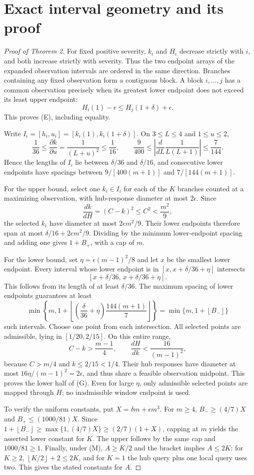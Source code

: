 \documentclass[11pt,letterpaper]{article}
\newcommand{\floor}[1]{\left\lfloor #1\right\rfloor}
\begin{document}
\section{Exact interval geometry and its proof}
\begin{proof}[Proof of Theorem 2]
For fixed positive severity, $k_i$ and $H_i$ decrease strictly with $i$, and both increase strictly with severity. Thus the two endpoint arrays of the expanded observation intervals are ordered in the same direction. Branches containing any fixed observation form a contiguous block. A block $i,\ldots,j$ has a common observation precisely when its greatest lower endpoint does not exceed its least upper endpoint:
\[
 H_i(1)-\epsilon\le H_j(1+\delta)+\epsilon.
\]
This proves (E), including equality.

Write $I_i=[h_i,u_i]=[k_i(1),k_i(1+\delta)]$. On $3\le L\le4$ and $1\le u\le2$,
\[
 \frac1{36}\le\frac{\partial k}{\partial u}=\frac1{(L+u)^2}\le\frac1{16},
 \qquad
 \frac9{400}\le\left|\frac{d}{dL}\frac1{L(L+1)}\right|\le\frac7{144}.
\]
Hence the lengths of $I_i$ lie between $\delta/36$ and $\delta/16$, and consecutive lower endpoints have spacings between $9/[400(m+1)]$ and $7/[144(m+1)]$.

For the upper bound, select one $k_i\in I_i$ for each of the $K$ branches counted at a maximizing observation, with hub-response diameter at most $2\epsilon$. Since
\[
 \frac{dk}{dH}=(C-k)^2\le C^2<\frac{m^2}{9},
\]
the selected $k_i$ have diameter at most $2\epsilon m^2/9$. Their lower endpoints therefore span at most $\delta/16+2\epsilon m^2/9$. Dividing by the minimum lower-endpoint spacing and adding one gives $1+B_+$, with a cap of $m$.

For the lower bound, set $\eta=\epsilon(m-1)^2/8$ and let $x$ be the smallest lower endpoint. Every interval whose lower endpoint is in $[x,x+\delta/36+\eta]$ intersects
\[
 [x+\delta/36,\,x+\delta/36+\eta].
\]
This follows from its length of at least $\delta/36$. The maximum spacing of lower endpoints guarantees at least
\[
 \min\left\{m,1+\floor{\left(\frac\delta{36}+\eta\right)\frac{144(m+1)}7}\right\}
 =\min\{m,1+\floor{B_-}\}
\]
such intervals. Choose one point from each intersection. All selected points are admissible, lying in $[1/20,2/15]$. On this entire range,
\[
 C-k>\frac{m-1}{4},\qquad \frac{dH}{dk}<\frac{16}{(m-1)^2},
\]
because $C>m/4$ and $k\le2/15<1/4$. Their hub responses have diameter at most $16\eta/(m-1)^2=2\epsilon$, and thus share a feasible observation midpoint. This proves the lower half of (G). Even for large $\eta$, only admissible selected points are mapped through $H$; no inadmissible window endpoint is used.

To verify the uniform constants, put $X=\delta m+\epsilon m^3$. For $m\ge4$, $B_-\ge(4/7)X$ and $B_+\le(1000/81)X$. Since $1+\floor{B_-}\ge\max\{1,(4/7)X\}\ge(2/7)(1+X)$, capping at $m$ yields the asserted lower constant for $K$. The upper follows by the same cap and $1000/81\ge1$. Finally, under (M), $A\ge K/2$ and the bracket implies $A\le2K$: for $K\ge2$, $\floor{K/2}+2\le2K$, and for $K=1$ the hub query plus one local query uses two. This gives the stated constants for $A$.
\end{proof}
\end{document}

